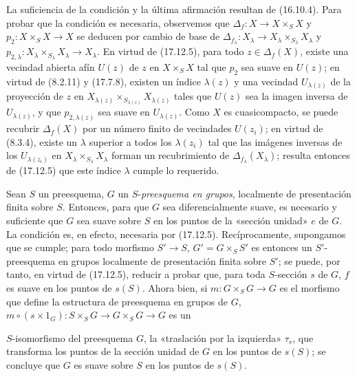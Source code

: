 La suficiencia de la condición y la última afirmación resultan de (16.10.4). Para probar que la condición es necesaria, observemos que $\Delta_f:X\to X\times_SX$ y $p_2:X\times_SX\to X$ se deducen por cambio de base de $\Delta_{f_\lambda}:X_\lambda\to X_\lambda\times_{S_\lambda}X_\lambda$ y $p_{2,\lambda}:X_\lambda\times_{S_\lambda}X_\lambda\to X_\lambda$. En virtud de (17.12.5), para todo $z\in\Delta_f(X)$, existe una vecindad abierta afín $U(z)$ de $z$ en $X\times_SX$ tal que $p_2$ sea suave en $U(z)$; en virtud de (8.2.11) y (17.7.8), existen un índice $\lambda(z)$ y una vecindad $U_{\lambda(z)}$ de la proyección de $z$ en $X_{\lambda(z)}\times_{S_{\lambda(z)}}X_{\lambda(z)}$ tales que $U(z)$ sea la imagen inversa de $U_{\lambda(z)}$, y que $p_{2,\lambda(z)}$ sea suave en $U_{\lambda(z)}$. Como $X$ es cuasicompacto, se puede recubrir $\Delta_f(X)$ por un número finito de vecindades $U(z_i)$; en virtud de (8.3.4), existe un $\lambda$ superior a todos los $\lambda(z_i)$ tal que las imágenes inversas de los $U_{\lambda(z_i)}$ en $X_\lambda\times_{S_\lambda}X_\lambda$ forman un recubrimiento de $\Delta_{f_\lambda}(X_\lambda)$; resulta entonces de (17.12.5) que este índice $\lambda$ cumple lo requerido.

\begin{example}[17.12.7]
\label{IV.17.12.7}
Sean $S$ un preesquema, $G$ un $S$-\emph{preesquema en grupos}, localmente de presentación finita sobre $S$. Entonces, para que $G$ sea diferencialmente suave, es necesario y suficiente que $G$ sea suave sobre $S$ en los puntos de la «sección unidad» $e$ de $G$. La condición es, en efecto, necesaria por (17.12.5). Recíprocamente, supongamos que se cumple; para todo morfismo $S'\to S$, $G'=G\times_SS'$ es entonces un $S'$-preesquema en grupos localmente de presentación finita sobre $S'$; se puede, por tanto, en virtud de (17.12.5), reducir a probar que, para toda $S$-sección $s$ de $G$, $f$ es suave en los puntos de $s(S)$. Ahora bien, si $m:G\times_SG\to G$ es el morfismo que define la estructura de preesquema en grupos de $G$, $m\circ(s\times1_G):S\times_SG\to G\times_SG\to G$ es un


$S$-isomorfismo del preesquema $G$, la «traslación por la izquierda» $\tau_s$, que transforma los puntos de la sección unidad de $G$ en los puntos de $s(S)$; se concluye que $G$ es suave sobre $S$ en los puntos de $s(S)$.
\end{example}

